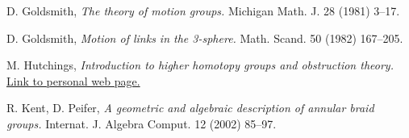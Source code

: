 \documentclass[11pt]{amsart}
\begin{document}
\begin{thebibliography}{99}
 D. Goldsmith,
\emph{The theory of motion groups.}
Michigan Math. J. 28 (1981) 3--17.

 D. Goldsmith,
\emph{Motion of links in the 3-sphere.}
Math. Scand. 50 (1982) 167--205.

 M. Hutchings,
\emph{Introduction to higher homotopy groups and obstruction theory.}
\href{https://math.berkeley.edu/~hutching/teach/215b-2011/homotopy.pdf}{Link to personal web page.}

 R. Kent, D. Peifer,
\emph{A geometric and algebraic description of annular braid groups.}
Internat. J. Algebra Comput. 12 (2002) 85--97. 

\end{thebibliography} 

\bigskip
\bigskip
\end{document}
